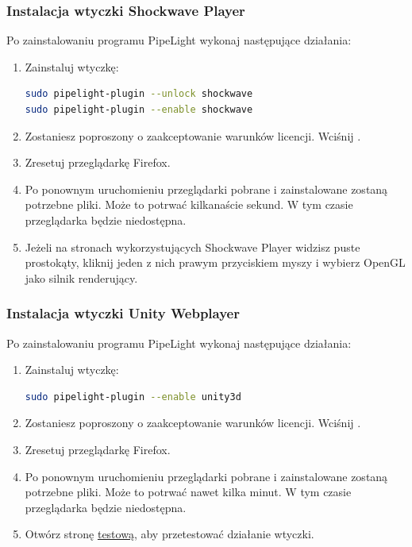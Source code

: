 \subsubsection{Instalacja wtyczki Shockwave Player}
\noindent Po zainstalowaniu programu PipeLight wykonaj następujące działania:
\begin{enumerate}
\item Zainstaluj wtyczkę:
\begin{lstlisting}[language=bash]
sudo pipelight-plugin --unlock shockwave
sudo pipelight-plugin --enable shockwave
\end{lstlisting}
\item Zostaniesz poproszony o zaakceptowanie warunków licencji. Wciśnij .
\item Zresetuj przeglądarkę Firefox.
\item Po ponownym uruchomieniu przeglądarki pobrane i zainstalowane zostaną potrzebne pliki. Może to potrwać kilkanaście sekund. W tym czasie przeglądarka będzie niedostępna.
\item Jeżeli na stronach wykorzystujących Shockwave Player widzisz puste prostokąty, kliknij jeden z nich prawym przyciskiem myszy i wybierz \textcolor{ubuntu_orange}{OpenGL} jako silnik renderujący.
\end{enumerate}

\subsubsection{Instalacja wtyczki Unity Webplayer}
\noindent Po zainstalowaniu programu PipeLight wykonaj następujące działania:
\begin{enumerate}
\item Zainstaluj wtyczkę:
\begin{lstlisting}[language=bash]
sudo pipelight-plugin --enable unity3d
\end{lstlisting}
\item Zostaniesz poproszony o zaakceptowanie warunków licencji. Wciśnij .
\item Zresetuj przeglądarkę Firefox.
\item Po ponownym uruchomieniu przeglądarki pobrane i zainstalowane zostaną potrzebne pliki. Może to potrwać nawet kilka minut. W tym czasie przeglądarka będzie niedostępna.
\item Otwórz stronę \href{https://unity3d.com/showcase/live-demos}{testową}, aby przetestować działanie wtyczki.
\end{enumerate}

